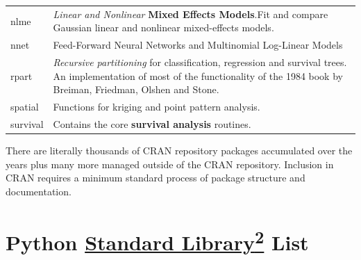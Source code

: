 \documentclass[]{book}
\theoremstyle{definition}
\theoremstyle{definition}
\theoremstyle{definition}
\theoremstyle{remark}
\begin{document}
\begin{longtable}[]{@{}ll@{}}
\begin{minipage}[t]{0.16\columnwidth}\raggedright\strut
nlme\strut
\end{minipage} & \begin{minipage}[t]{0.73\columnwidth}\raggedright\strut
\emph{Linear and Nonlinear} \textbf{Mixed Effects Models}.Fit and
compare Gaussian linear and nonlinear mixed-effects models.\strut
\end{minipage}\tabularnewline
\begin{minipage}[t]{0.16\columnwidth}\raggedright\strut
nnet\strut
\end{minipage} & \begin{minipage}[t]{0.73\columnwidth}\raggedright\strut
Feed-Forward Neural Networks and Multinomial Log-Linear Models\strut
\end{minipage}\tabularnewline
\begin{minipage}[t]{0.16\columnwidth}\raggedright\strut
rpart\strut
\end{minipage} & \begin{minipage}[t]{0.73\columnwidth}\raggedright\strut
\emph{Recursive partitioning} for classification, regression and
survival trees. An implementation of most of the functionality of the
1984 book by Breiman, Friedman, Olshen and Stone.\strut
\end{minipage}\tabularnewline
\begin{minipage}[t]{0.16\columnwidth}\raggedright\strut
spatial\strut
\end{minipage} & \begin{minipage}[t]{0.73\columnwidth}\raggedright\strut
Functions for kriging and point pattern analysis.\strut
\end{minipage}\tabularnewline
\begin{minipage}[t]{0.16\columnwidth}\raggedright\strut
survival\strut
\end{minipage} & \begin{minipage}[t]{0.73\columnwidth}\raggedright\strut
Contains the core \textbf{survival analysis} routines.\strut
\end{minipage}\tabularnewline
\bottomrule
\end{longtable}

There are literally thousands of CRAN repository packages accumulated
over the years plus many more managed outside of the CRAN repository.
Inclusion in CRAN requires a minimum standard process of package
structure and documentation.

\section{\texorpdfstring{Python
\href{https://docs.python.org/3.7/library/index.html}{Standard
Library\textsuperscript{2}}
List}{Python Standard Library2 List}}\label{python-standard-library2-list}
\end{document}
